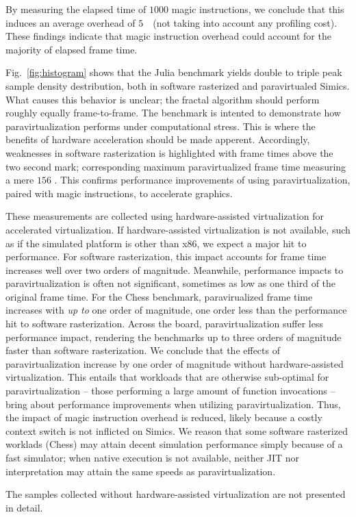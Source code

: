 By measuring the elapsed time of $1000$ magic instructions, we conclude that this induces an average overhead of $5$~\milli\second\ (not taking into account any profiling cost).
These findings indicate that magic instruction overhead could account for the majority of elapsed frame time.

Fig.~\ref{fig:histogram} shows that the Julia benchmark yields double to triple peak sample density destribution, both in software rasterized and paravirtualed Simics.
What causes this behavior is unclear; the fractal algorithm should perform roughly equally frame-to-frame.
The benchmark is intented to demonstrate how paravirtualization performs under computational stress.
This is where the benefits of hardware acceleration should be made apperent.
Accordingly, weaknesses in software rasterization is highlighted with frame times above the two second mark; corresponding maximum paravirtualized frame time measuring a mere $156$ \milli\second.
This confirms performance improvements of using paravirtualization, paired with magic instructions, to accelerate graphics.

These measurements are collected using hardware-assisted virtualization for accelerated virtualization.
If hardware-assisted virtualization is not available, such as if the simulated platform is other than x86, we expect a major hit to performance.
For software rasterization, this impact accounts for frame time increases well over two orders of magnitude.
Meanwhile, performance impacts to paravirtualization is often not significant, sometimes as low as one third of the original frame time.
For the Chess benchmark, paravirualized frame time increases with \textit{up to} one order of magnitude, one order less than the performance hit to software rasterization.
Across the board, paravirtualization suffer less performance impact, rendering the benchmarks up to three orders of magnitude faster than software rasterization.
We conclude that the effects of paravirtualization increase by one order of magnitude without hardware-assisted virtualization.
This entails that workloads that are otherwise sub-optimal for paravirtualization -- those performing a large amount of function invocations -- bring about performance improvements when utilizing paravirtualization.
Thus, the impact of magic instruction overhead is reduced, likely because a costly context switch is not inflicted on Simics.
We reason that some software rasterized worklads (Chess) may attain decent simulation performance simply because of a fast simulator; when native execution is not available, neither JIT nor interpretation may attain the same speeds as paravirtualization.

The samples collected without hardware-assisted virtualization are not presented in detail. %

